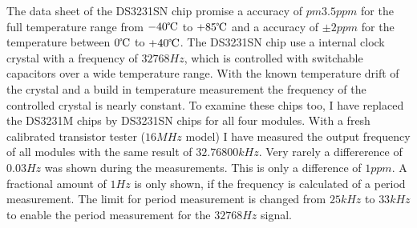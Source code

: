 The data sheet of the DS3231SN chip promise a accuracy of \(pm 3.5ppm\) for the full
temperature range from \(-40\celsius\) to \(+85\celsius\) and a accuracy of \(\pm 2ppm\)
for the temperature between \(0\celsius\) to \(+40\celsius\).
The DS3231SN chip use a internal clock crystal with a frequency of \(32768Hz\), which is
controlled with switchable capacitors over a wide temperature range.
With the known temperature drift of the crystal and a build in temperature measurement
the frequency of the controlled crystal is nearly constant.
To examine these chips too, I have replaced the DS3231M chips by DS3231SN chips for
all four modules.
With a fresh calibrated transistor tester (\(16MHz\) model) I have measured the output frequency of all
modules with the same result of \(32.76800kHz\). Very rarely a differerence of \(0.03Hz\)
was shown during the measurements. This is only a difference of \(1ppm\).
A fractional amount of \(1Hz\) is only shown, if the frequency is calculated of a period measurement.
The limit for period measurement is changed from \(25kHz\) to \(33kHz\) to enable
the period measurement for the \(32768Hz\) signal.

